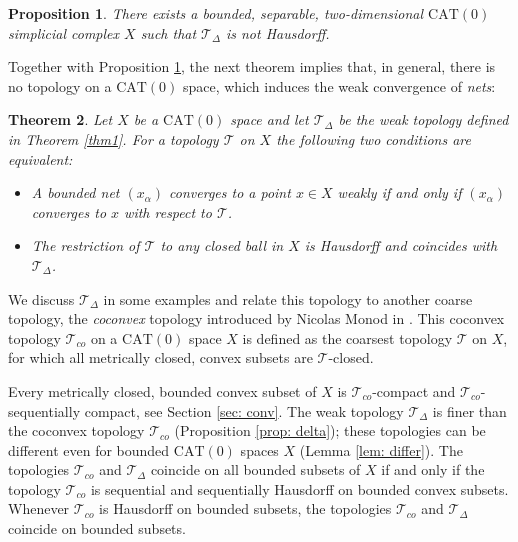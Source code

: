 \documentclass[12pt,leqno]{amsart}
\numberwithin{equation}{section}
\newtheorem{thm}{Theorem}[section]
\newtheorem{prop}[thm]{Proposition}
\theoremstyle{remark}
\newcommand{\CAT}{\mathrm{CAT}}
\begin{document}
\begin{prop} \label{prop: haus}
There exists a bounded, separable, two-dimensional $\CAT(0)$ simplicial complex $X$
such that $\mathcal T_{\Delta}$ is not Hausdorff.
\end{prop} 

Together with Proposition \ref{prop: haus}, the next theorem implies that, in general, there is no topology on a $\CAT(0)$ space, which induces the weak convergence of \emph{nets}:

\begin{thm} \label{thm2}
Let $X$ be a $\CAT(0)$ space and let $\mathcal T_{\Delta}$ be the weak topology 	defined in Theorem \ref{thm1}. 
For a topology $\mathcal T$ on $X$ the following two conditions are equivalent:

\begin{itemize}

\item A bounded net $(x_{\alpha})$ converges to a point $x\in X$ weakly if and only if $(x_{\alpha})$ converges to $x$ with respect to $\mathcal T$.

\item The restriction of $\mathcal T$ to any closed ball in $X$ is Hausdorff and coincides with $\mathcal T_{\Delta}$. 

\end{itemize}
\end{thm}

We discuss $\mathcal T_{\Delta}$ in some examples and relate this topology to another coarse topology,
the \emph{coconvex} topology introduced by Nicolas Monod in \cite{Monod}. This coconvex topology $\mathcal T_{co}$ on a $\CAT(0)$ space $X$ is defined as the coarsest topology $\mathcal T$ on $X$, for which all metrically closed, convex subsets are $\mathcal T$-closed. 

Every metrically closed, bounded convex subset of $X$ is $\mathcal T_{co}$-compact and $\mathcal T_{co}$-sequentially compact, see Section \ref{sec: conv}.
The weak topology $\mathcal T_{\Delta}$ is finer than the coconvex topology $\mathcal T_{co}$ (Proposition \ref{prop: delta}); these topologies can be different even for bounded $\CAT(0)$ spaces $X$ (Lemma \ref{lem: differ}).
The topologies $\mathcal T_{co}$ and $\mathcal T_{\Delta}$ coincide on all bounded subsets of $X$ if and only if the topology $\mathcal T_{co}$ is sequential and sequentially Hausdorff on bounded convex subsets. 
Whenever $\mathcal T_{co}$ is Hausdorff on bounded subsets, the topologies $\mathcal T_{co}$ and $\mathcal T_{\Delta}$ coincide on bounded subsets. 
\end{document}
